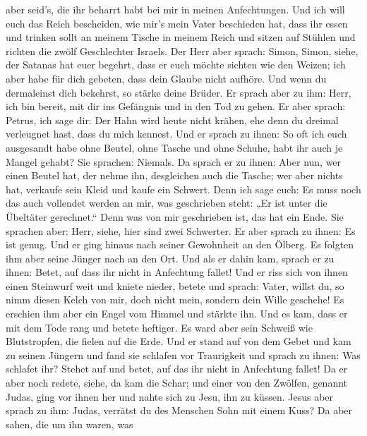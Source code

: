 aber seid's, die ihr beharrt habt bei mir in meinen Anfechtungen.
 Und ich will euch das Reich bescheiden, wie mir's mein
Vater beschieden hat,  dass ihr essen und trinken sollt an
meinem Tische in meinem Reich und sitzen auf Stühlen und richten die
zwölf Geschlechter Israels.  Der Herr aber sprach: Simon,
Simon, siehe, der Satanas hat euer begehrt, dass er euch möchte sichten
wie den Weizen;  ich aber habe für dich gebeten, dass dein
Glaube nicht aufhöre. Und wenn du dermaleinst dich bekehrst, so stärke
deine Brüder.  Er sprach aber zu ihm: Herr, ich bin bereit,
mit dir ins Gefängnis und in den Tod zu gehen.  Er aber
sprach: Petrus, ich sage dir: Der Hahn wird heute nicht krähen, ehe denn
du dreimal verleugnet hast, dass du mich kennest.  Und er
sprach zu ihnen: So oft ich euch ausgesandt habe ohne Beutel, ohne
Tasche und ohne Schuhe, habt ihr auch je Mangel gehabt? Sie sprachen:
Niemals.  Da sprach er zu ihnen: Aber nun, wer einen Beutel
hat, der nehme ihn, desgleichen auch die Tasche; wer aber nichts hat,
verkaufe sein Kleid und kaufe ein Schwert.  Denn ich sage
euch: Es muss noch das auch vollendet werden an mir, was geschrieben
steht: „Er ist unter die Übeltäter gerechnet.`` Denn was von mir
geschrieben ist, das hat ein Ende.  Sie sprachen aber:
Herr, siehe, hier sind zwei Schwerter. Er aber sprach zu ihnen: Es ist
genug.  Und er ging hinaus nach seiner Gewohnheit an den
Ölberg. Es folgten ihm aber seine Jünger nach an den Ort. 
Und als er dahin kam, sprach er zu ihnen: Betet, auf dass ihr nicht in
Anfechtung fallet!  Und er riss sich von ihnen einen
Steinwurf weit und kniete nieder, betete  und sprach:
Vater, willst du, so nimm diesen Kelch von mir, doch nicht mein, sondern
dein Wille geschehe!  Es erschien ihm aber ein Engel vom
Himmel und stärkte ihn.  Und es kam, dass er mit dem Tode
rang und betete heftiger. Es ward aber sein Schweiß wie Blutstropfen,
die fielen auf die Erde.  Und er stand auf von dem Gebet
und kam zu seinen Jüngern und fand sie schlafen vor Traurigkeit
 und sprach zu ihnen: Was schlafet ihr? Stehet auf und
betet, auf das ihr nicht in Anfechtung fallet!  Da er aber
noch redete, siehe, da kam die Schar; und einer von den Zwölfen, genannt
Judas, ging vor ihnen her und nahte sich zu Jesu, ihn zu küssen.
 Jesus aber sprach zu ihm: Judas, verrätst du des Menschen
Sohn mit einem Kuss?  Da aber sahen, die um ihn waren, was
